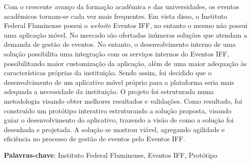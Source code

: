 \setlength{\absparsep}{18pt} %
\begin{resumo}
 
Com o crescente avanço da formação acadêmica e das universidades, os eventos acadêmicos tornam-se cada vez mais frequentes. Em vista disso, o Instituto Federal Fluminense possui o \textit{website} Eventos IFF, no entanto o mesmo não possui uma aplicação móvel. No mercado são ofertadas inúmeras soluções que atendam a demanda de gestão de eventos. No entanto, o desenvolvimento interno de uma solução possibilita uma integração com os serviços internos do Eventos IFF, possibilitando maior customização da aplicação, além de uma maior adequação às características próprias da instituição. Sendo assim, foi decidido que o desenvolvimento de um aplicativo móvel próprio para a plataforma seria mais adequada a necessidade da instituição. O projeto foi estruturada numa metodologia visando obter melhores resultados e validações. Como resultado, foi construído um protótipo interativo estruturando a solução proposta, visando guiar o desenvolvimento do aplicativo, trazendo a visão de como a solução foi desenhada e projetada. A solução se mostrou viável, agregando agilidade e eficiência no processo de gestão de eventos pelo Eventos IFF.


 \textbf{Palavras-chave}: Instituto Federal Fluminense, Eventos IFF, Protótipo
\end{resumo}

